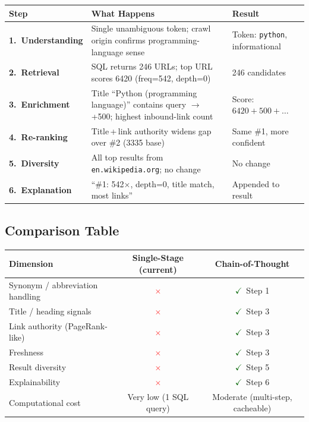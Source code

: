 \documentclass[12pt,a4paper]{article}
\begin{document}
\renewcommand{\arraystretch}{1.3}
\begin{center}
\small
\begin{tabular}{>{\bfseries}p{2.8cm} p{6cm} p{4.5cm}}
  \toprule
  Step & What Happens & Result \\
  \midrule
  1.\ Understanding &
    Single unambiguous token; crawl origin confirms programming-language sense &
    Token: \texttt{python}, informational \\
  2.\ Retrieval &
    SQL returns 246 URLs; top URL scores 6420 (freq=542, depth=0) &
    246 candidates \\
  3.\ Enrichment &
    Title ``Python (programming language)'' contains query $\to$ +500;
    highest inbound-link count &
    Score: $6420+500+\ldots$ \\
  4.\ Re-ranking &
    Title\,+\,link authority widens gap over \#2 (3335 base) &
    Same \#1, more confident \\
  5.\ Diversity &
    All top results from \texttt{en.wikipedia.org}; no change &
    No change \\
  6.\ Explanation &
    ``\#1: 542$\times$, depth=0, title match, most links'' &
    Appended to result \\
  \bottomrule
\end{tabular}
\end{center}
\renewcommand{\arraystretch}{1}

\subsection*{Comparison Table}

\begin{center}
\begin{tabular}{lcc}
  \toprule
  \textbf{Dimension} & \textbf{Single-Stage (current)} & \textbf{Chain-of-Thought} \\
  \midrule
  Synonym / abbreviation handling & \textcolor{red}{$\times$} & \textcolor{darkgreen}{$\checkmark$}\ Step 1 \\
  Title / heading signals         & \textcolor{red}{$\times$} & \textcolor{darkgreen}{$\checkmark$}\ Step 3 \\
  Link authority (PageRank-like)  & \textcolor{red}{$\times$} & \textcolor{darkgreen}{$\checkmark$}\ Step 3 \\
  Freshness                       & \textcolor{red}{$\times$} & \textcolor{darkgreen}{$\checkmark$}\ Step 3 \\
  Result diversity                & \textcolor{red}{$\times$} & \textcolor{darkgreen}{$\checkmark$}\ Step 5 \\
  Explainability                  & \textcolor{red}{$\times$} & \textcolor{darkgreen}{$\checkmark$}\ Step 6 \\
  Computational cost              & Very low (1 SQL query)    & Moderate (multi-step, cacheable) \\
  \bottomrule
\end{tabular}
\end{center}
\end{document}
